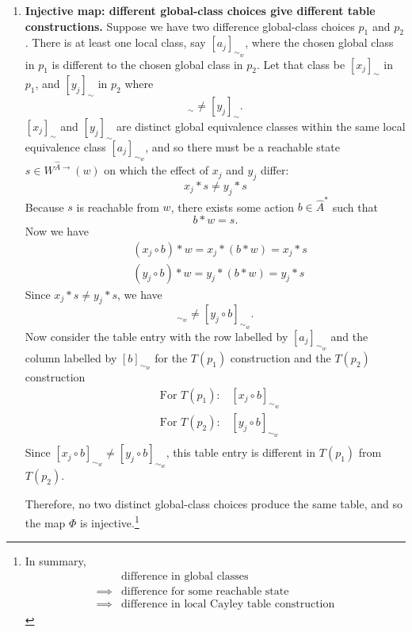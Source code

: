 \begin{proofE}
\begin{enumerate}[(1)]
    \item \textbf{Injective map: different global-class choices give different table constructions.}
    Suppose we have two difference global-class choices $p_{1}$ and $p_{2}$.
    There is at least one local class, say $[a_{j}]_{\sim_{w}}$, where the chosen global class in $p_{1}$ is different to the chosen global class in $p_{2}$.
    Let that class be $[x_{j}]_{\sim}$ in $p_{1}$, and $[y_{j}]_{\sim}$ in $p_{2}$ where
    \begin{equation}
        [x_{j}]_{\sim} \neq [y_{j}]_{\sim}.
    \end{equation}
    $[x_{j}]_{\sim}$ and $[y_{j}]_{\sim}$ are distinct global equivalence classes within the same local equivalence class $[a_{j}]_{\sim_{w}}$, and so there must be a reachable state $s \in W^{\hat{A}\to}(w)$ on which the effect of $x_{j}$ and $y_{j}$ differ:
    \begin{equation}
        x_{j} \ast s \neq y_{j} \ast s
    \end{equation}
    Because $s$ is reachable from $w$, there exists some action $b \in \hat{A}^{*}$ such that
    \begin{equation}
        b \ast w = s.
    \end{equation}
    Now we have
    \begin{align}
        & (x_{j} \circ b) \ast w = x_{j} \ast (b \ast w) = x_{j} \ast s \\
        & (y_{j} \circ b) \ast w = y_{j} \ast (b \ast w) = y_{j} \ast s
    \end{align}
    Since $x_{j} \ast s \neq y_{j} \ast s$, we have
    \begin{equation}
        [x_{j} \circ b]_{\sim_{w}} \neq [y_{j} \circ b]_{\sim_{w}} .
    \end{equation}
    Now consider the table entry with the row labelled by $[a_{j}]_{\sim_{w}}$ and the column labelled by $[b]_{\sim_{w}}$ for the $T(p_{1})$ construction and the $T(p_{2})$ construction
    \begin{align}
        & \text{For $T(p_{1})$:} \quad [x_{j} \circ b]_{\sim_{w}} \\
        & \text{For $T(p_{2})$:} \quad [y_{j} \circ b]_{\sim_{w}} \\
    \end{align}
    Since $[x_{j} \circ b]_{\sim_{w}} \neq [y_{j} \circ b]_{\sim_{w}}$, this table entry is different in $T(p_{1})$ from $T(p_{2})$.
    
    Therefore, no two distinct global-class choices produce the same table, and so the map $\Phi$ is injective.\footnote{
    In summary,
    \begin{equation}
    \begin{aligned}
        & \text{difference in global classes} \\
        \implies & \text{difference for some reachable state} \\
        \implies & \text{difference in local Cayley table construction}
    \end{aligned}
    \end{equation}
    }


\end{enumerate}
\end{proofE}

